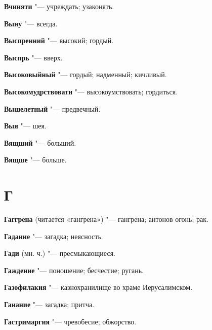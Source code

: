 \begin{mymulticols}{2}
\noindent\textbf{Вчиняти} "--- учреждать; узаконять. 




\noindent\textbf{Выну} "--- всегда. 




\noindent\textbf{Выспренний} "--- высокий; гордый. 




\noindent\textbf{Выспрь} "--- вверх. 




\noindent\textbf{Высоковыйный} "--- гордый; надменный; кичливый. 




\noindent\textbf{Высокомудрствовати} "--- высокоумствовать; гордиться. 




\noindent\textbf{Вышелетный} "--- предвечный. 




\noindent\textbf{Выя} "--- шея. 




\noindent\textbf{Вящший} "--- больший. 




\noindent\textbf{Вящше} "--- больше. 




\section{Г} 





\noindent\textbf{Гаггрена} (читается «гангрена») "--- гангрена; антонов огонь; рак. 




\noindent\textbf{Гадание} "--- загадка; неясность. 




\noindent\textbf{Гади} (мн. ч.) "--- пресмыкающиеся. 




\noindent\textbf{Гаждение} "--- поношение; бесчестие; ругань. 




\noindent\textbf{Газофилакия} "--- казнохранилище во храме Иерусалимском. 




\noindent\textbf{Ганание} "--- загадка; притча. 




\noindent\textbf{Гастримаргия} "--- чревобесие; обжорство. 





\end{mymulticols}
